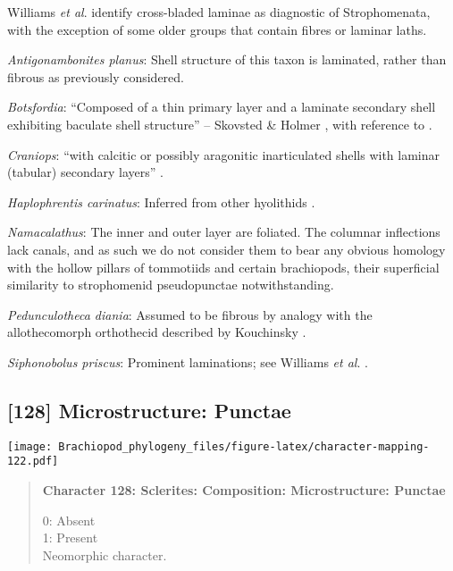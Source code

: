 \documentclass[openany]{book}
\theoremstyle{definition}
\theoremstyle{definition}
\theoremstyle{definition}
\theoremstyle{remark}
\begin{document}
Williams \emph{et al}.
\citeyearpar{Williams2000LinguliformeaCraniiformea} identify
cross-bladed laminae as diagnostic of Strophomenata, with the exception
of some older groups that contain fibres or laminar laths.

\hypertarget{Antigonambonites_planus-coding-127}{}
\emph{Antigonambonites planus}: Shell structure of this taxon is
laminated, rather than fibrous as previously considered.

\hypertarget{Botsfordia-coding-127}{}
\emph{Botsfordia}: ``Composed of a thin primary layer and a laminate
secondary shell exhibiting baculate shell structure'' -- Skovsted \&
Holmer \citeyearpar{Skovsted2005EarlyCambrian}, with reference to
\citet{Skovsted2003EarlyCambrian}.

\hypertarget{Craniops-coding-127}{}
\emph{Craniops}: ``with calcitic or possibly aragonitic inarticulated
shells with laminar (tabular) secondary layers''
\citep{Williams2000LinguliformeaCraniiformea}.

\hypertarget{Haplophrentis_carinatus-coding-127}{}
\emph{Haplophrentis carinatus}: Inferred from other hyolithids
\citep[e.g.][]{Moore2018Plywoodlike}.

\hypertarget{Namacalathus-coding-127}{}
\emph{Namacalathus}: The inner and outer layer are foliated. The
columnar inflections lack canals, and as such we do not consider them to
bear any obvious homology with the hollow pillars of tommotiids and
certain brachiopods, their superficial similarity to strophomenid
pseudopunctae notwithstanding.

\hypertarget{Pedunculotheca_diania-coding-127}{}
\emph{Pedunculotheca diania}: Assumed to be fibrous by analogy with the
allothecomorph orthothecid described by Kouchinsky
\citeyearpar{Kouchinsky2000Skeletalmicrostructures}.

\hypertarget{Siphonobolus_priscus-coding-127}{}
\emph{Siphonobolus priscus}: Prominent laminations; see Williams
\emph{et al}. \citeyearpar{Williams2004Chemicostructure}.

\subsection*{{[}128{]} Microstructure:
Punctae}\label{microstructure-punctae}

\texttt{[image: Brachiopod\_phylogeny\_files/figure-latex/character-mapping-122.pdf]}

\begin{quote}
\textbf{Character 128: Sclerites: Composition: Microstructure: Punctae}

0: Absent\\
1: Present\\
Neomorphic character.
\end{quote}
\end{document}
